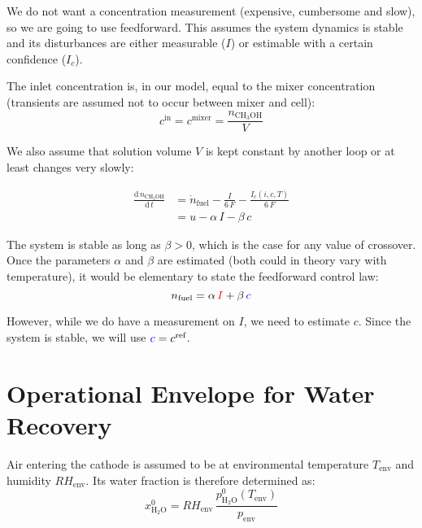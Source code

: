 \documentclass[a4paper,10pt]{article}
\newcommand{\MeOH}{\ensuremath{\mathrm{CH_3OH}}}
\newcommand{\HHO}{\ensuremath{\mathrm{H_2O}}}
\newcommand{\Measurement}[1]{\textcolor{red}{#1}}
\newcommand{\Estimate}[1]{\textcolor{blue}{#1}}
\newcommand{\DER}[2]{\ensuremath{\frac{\mathrm{d}\,#1}{\mathrm{d}\,#2}}}
\begin{document}
We do not want a concentration measurement (expensive, cumbersome and slow), so
we are going to use feedforward. This assumes the system dynamics is stable and
its disturbances are either measurable ($I$) or estimable with a certain
confidence ($I_c$).

The inlet concentration is, in our model, equal to the mixer concentration
(transients are assumed not to occur between mixer and cell):
\begin{equation}
c^\text{in} = c^\text{mixer} = \frac{n_\MeOH}{V}
\end{equation}

We also assume that solution volume $V$ is kept constant by another loop or at
least changes very slowly:

\begin{equation}
\begin{aligned}
\DER{n_\MeOH}{t} & = \dot n_\text{fuel} - \frac{I}{6\,F}
- \frac{I_c(i,c,T)}{6\,F}\\
& = u - \alpha\,I - \beta\,c
\end{aligned}
\end{equation}

The system is stable as long as $\beta>0$, which is the case for any value of
crossover. Once the parameters $\alpha$ and $\beta$ are estimated (both could
in theory vary with temperature), it would be elementary to state the
feedforward control law:
\begin{equation}
n_\text{fuel} = \alpha\,\Measurement{I} + \beta\,\Estimate{c}
\end{equation}

However, while we do have a measurement on $I$, we need to estimate $c$. Since
the system is stable, we will use $\Estimate{c} = c^\text{ref}$.









\pagebreak
\section{Operational Envelope for Water Recovery}
Air entering the cathode is assumed to be at environmental temperature
$T_\text{env}$ and humidity $RH_\text{env}$. Its water fraction is therefore
determined as:
\begin{equation}
x_\HHO^0 = RH_\text{env}\,\frac{p_\HHO^0(T_\text{env})}{p_\text{env}}
\end{equation}
\end{document}
